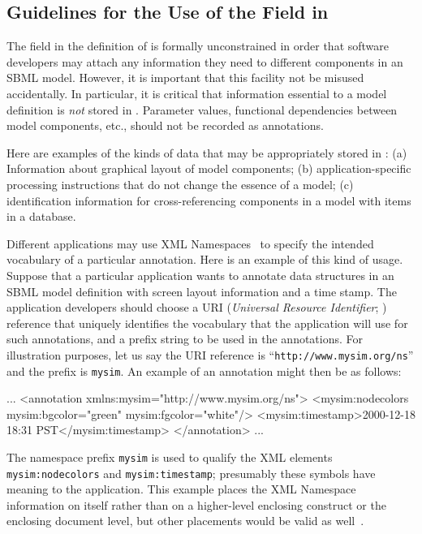 \documentclass[10pt,twocolumntoc]{cekarticle}
\begin{document}
\subsection{Guidelines for the Use of the  Field in
  }

The  field in the definition of  is
formally unconstrained in order that software developers may attach any
information they need to different components in an SBML model. However,
it is important that this facility not be misused accidentally.  In
particular, it is critical that information essential to a model definition
is \emph{not} stored in .  Parameter values, functional
dependencies between model components, etc., should not be recorded as
annotations.

Here are examples of the kinds of data that may be appropriately
stored in : (a) Information about graphical
layout of model components; (b) application-specific processing
instructions that do not change the essence of a model; (c)
identification information for cross-referencing components in a
model with items in a database.

Different applications may use XML Namespaces~\citep{bray:1999} to specify
the intended vocabulary of a particular annotation.  Here is an example of
this kind of usage.  Suppose that a particular application wants to
annotate data structures in an SBML model definition with screen layout
information and a time stamp.  The application developers should choose a
URI (\emph{Universal Resource Identifier}; \citealt{harold:2001,w3c:2000})
reference that uniquely identifies the vocabulary that the
application will use for such annotations, and a prefix string to be used
in the annotations.  For illustration purposes, let us say the URI
reference is ``\texttt{http://www.mysim.org/ns}'' and the prefix is
\texttt{mysim}.  An example of an annotation might then be as follows:

\begin{example}
...
<annotation xmlns:mysim="http://www.mysim.org/ns">
    <mysim:nodecolors mysim:bgcolor="green" mysim:fgcolor="white"/>
    <mysim:timestamp>2000-12-18 18:31 PST</mysim:timestamp>
</annotation>
...
\end{example}

The namespace prefix \texttt{mysim} is used to qualify the XML elements
\texttt{mysim:nodecolors} and \texttt{mysim:timestamp}; presumably these
symbols have meaning to the application.  This example places the XML
Namespace information on  itself rather than on a
higher-level enclosing construct or the enclosing document level, but other
placements would be valid as well~\citep{bray:1999}.
\end{document}
